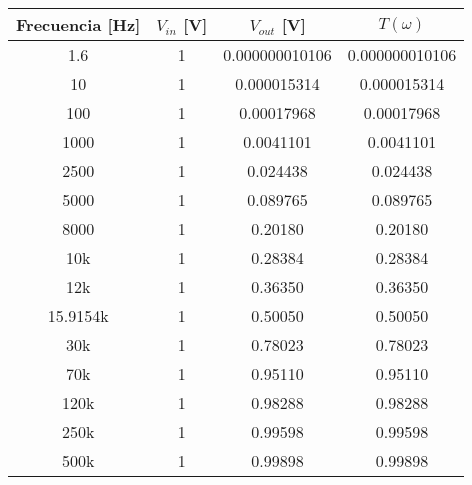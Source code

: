 \documentclass[letterpaper,11pt]{article} %
\begin{document}
\begin{center}
\begin{tabular}{|c|c|c|c|}
\hline
\textbf{Frecuencia {[}Hz{]}} & \textbf{$V_{in}$ {[}V{]}} & \textbf{$V_{out}$ {[}V{]}} & \textbf{$T(\omega)$} \\ \hline
1.6                          & 1                         & 0.000000010106             & 0.000000010106       \\ \hline
10                           & 1                         & 0.000015314                & 0.000015314          \\ \hline
100                          & 1                         & 0.00017968                 & 0.00017968           \\ \hline
1000                         & 1                         & 0.0041101                  & 0.0041101            \\ \hline
2500                         & 1                         & 0.024438                   & 0.024438             \\ \hline
5000                         & 1                         & 0.089765                   & 0.089765             \\ \hline
8000                         & 1                         & 0.20180                    & 0.20180              \\ \hline
10k                          & 1                         & 0.28384                    & 0.28384              \\ \hline
12k                          & 1                         & 0.36350                    & 0.36350              \\ \hline
15.9154k                     & 1                         & 0.50050                    & 0.50050              \\ \hline
30k                          & 1                         & 0.78023                    & 0.78023              \\ \hline
70k                          & 1                         & 0.95110                    & 0.95110              \\ \hline
120k                         & 1                         & 0.98288                    & 0.98288              \\ \hline
250k                         & 1                         & 0.99598                    & 0.99598              \\ \hline
500k                         & 1                         & 0.99898                    & 0.99898              \\ \hline

\end{tabular}
\end{center}
\end{document}

